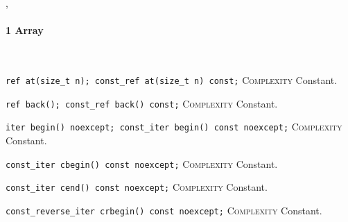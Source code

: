 
\sep
{}
\paragraph{1 Array}\mbox{}\vspace{0.5em}\\
\noindent{}\hspace*{0.25em}\lstinline[basicstyle=\ttfamily\color{cgreen}]{ref at(size_t n); const_ref at(size_t n) const;} \textsc{Complexity} Constant.\\\vspace{-0.6em}

\noindent{}\hspace*{0.25em}\lstinline[basicstyle=\ttfamily\color{cgreen}]{ref back(); const_ref back() const;} \textsc{Complexity} Constant.\\\vspace{-0.6em}

\noindent{}\hspace*{0.25em}\lstinline[basicstyle=\ttfamily\color{cgreen}]{iter begin() noexcept; const_iter begin() const noexcept;} \textsc{Complexity} Constant.\\\vspace{-0.6em}

\noindent{}\hspace*{0.25em}\lstinline[basicstyle=\ttfamily\color{cgreen}]{const_iter cbegin() const noexcept;} \textsc{Complexity} Constant.\\\vspace{-0.6em}

\noindent{}\hspace*{0.25em}\lstinline[basicstyle=\ttfamily\color{cgreen}]{const_iter cend() const noexcept;} \textsc{Complexity} Constant.\\\vspace{-0.6em}

\noindent{}\hspace*{0.25em}\lstinline[basicstyle=\ttfamily\color{cgreen}]{const_reverse_iter crbegin() const noexcept;} \textsc{Complexity} Constant.\\\vspace{-0.6em}

